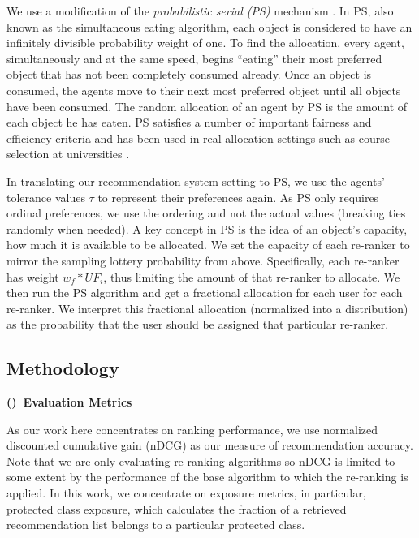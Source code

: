 We use a modification of the \emph{probabilistic serial (PS)} mechanism \cite{bogomolnaia2001new}.  In PS, also known as the simultaneous eating algorithm, each object is considered to have an infinitely divisible probability weight of one.  To find the allocation, every agent, simultaneously and at the same speed, begins ``eating'' their most preferred object that has not been completely consumed already.  Once an object is consumed, the agents move to their next most preferred object until all objects have been consumed. The random allocation of an agent by PS is the amount of each object he has eaten. PS satisfies a number of important fairness and efficiency criteria \cite{Aziz:EqulibriaPS,Aziz:EgalRandom} and has been used in real allocation settings such as course selection at universities \cite{budish2013designing}.

In translating our recommendation system setting to PS, we use the agents' tolerance values $\tau$ to represent their preferences again. As PS only requires ordinal preferences, we use the ordering and not the actual values (breaking ties randomly when needed). A key concept in PS is the idea of an object's capacity, how much it is available to be allocated. We set the capacity of each re-ranker to mirror the sampling lottery probability from above. Specifically, each re-ranker has weight $w_f * UF_i$, thus limiting the amount of that re-ranker to allocate. We then run the PS algorithm and get a fractional allocation for each user for each re-ranker. We interpret this fractional allocation (normalized into a distribution) as the probability that the user should be assigned that particular re-ranker.



\subsection{Methodology}

\vspace{0.25cm}
\noindent \textbf{()~Evaluation Metrics}
\vspace{0.25cm}

As our work here concentrates on ranking performance, we use normalized discounted cumulative gain (nDCG) as our measure of recommendation accuracy. Note that we are only evaluating re-ranking algorithms so nDCG is limited to some extent by the performance of the base algorithm to which the re-ranking is applied. In this work, we concentrate on exposure metrics, in particular, protected class exposure, which calculates the fraction of a retrieved recommendation list belongs to a particular protected class. 

